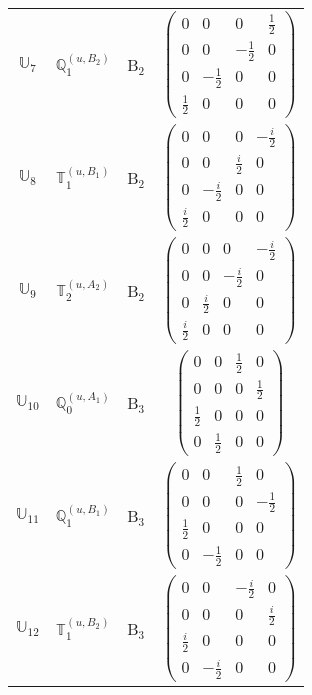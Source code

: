 \documentclass[fleqn,10pt,landscape]{article}
\begin{document}
\begin{itemize}
\begin{center}
\begin{longtable}{c|c|c|c}
$ \mathbb{U}_{7} $ & $\mathbb{Q}_{1}^{(u,B_{2})}$ & B$_{2}$ & $\begin{pmatrix} 0 & 0 & 0 & \frac{1}{2} \\ 0 & 0 & - \frac{1}{2} & 0 \\ 0 & - \frac{1}{2} & 0 & 0 \\ \frac{1}{2} & 0 & 0 & 0 \end{pmatrix}$ \\
$ \mathbb{U}_{8} $ & $\mathbb{T}_{1}^{(u,B_{1})}$ & B$_{2}$ & $\begin{pmatrix} 0 & 0 & 0 & - \frac{i}{2} \\ 0 & 0 & \frac{i}{2} & 0 \\ 0 & - \frac{i}{2} & 0 & 0 \\ \frac{i}{2} & 0 & 0 & 0 \end{pmatrix}$ \\
$ \mathbb{U}_{9} $ & $\mathbb{T}_{2}^{(u,A_{2})}$ & B$_{2}$ & $\begin{pmatrix} 0 & 0 & 0 & - \frac{i}{2} \\ 0 & 0 & - \frac{i}{2} & 0 \\ 0 & \frac{i}{2} & 0 & 0 \\ \frac{i}{2} & 0 & 0 & 0 \end{pmatrix}$ \\ \hline
$ \mathbb{U}_{10} $ & $\mathbb{Q}_{0}^{(u,A_{1})}$ & B$_{3}$ & $\begin{pmatrix} 0 & 0 & \frac{1}{2} & 0 \\ 0 & 0 & 0 & \frac{1}{2} \\ \frac{1}{2} & 0 & 0 & 0 \\ 0 & \frac{1}{2} & 0 & 0 \end{pmatrix}$ \\
$ \mathbb{U}_{11} $ & $\mathbb{Q}_{1}^{(u,B_{1})}$ & B$_{3}$ & $\begin{pmatrix} 0 & 0 & \frac{1}{2} & 0 \\ 0 & 0 & 0 & - \frac{1}{2} \\ \frac{1}{2} & 0 & 0 & 0 \\ 0 & - \frac{1}{2} & 0 & 0 \end{pmatrix}$ \\
$ \mathbb{U}_{12} $ & $\mathbb{T}_{1}^{(u,B_{2})}$ & B$_{3}$ & $\begin{pmatrix} 0 & 0 & - \frac{i}{2} & 0 \\ 0 & 0 & 0 & \frac{i}{2} \\ \frac{i}{2} & 0 & 0 & 0 \\ 0 & - \frac{i}{2} & 0 & 0 \end{pmatrix}$ \\

\end{longtable}
\end{center}
\end{itemize}
\end{document}
